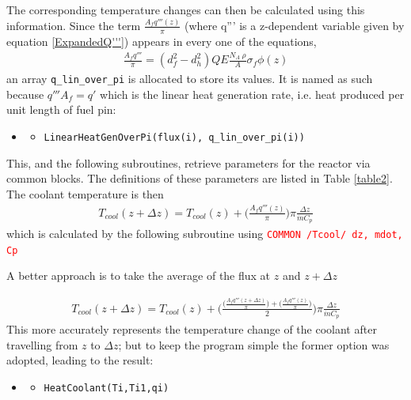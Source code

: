 \documentclass[a4paper, 12pt]{article}
\begin{document}
The corresponding temperature changes can then be calculated using this information.
Since the term $\frac{A_f q'''(z)}{\pi}$ (where q''' is a z-dependent variable given by equation \ref{ExpandedQ'''}) appears in every one of the equations,
\begin{align}
\frac{A_f q'''}{\pi} = (d_f^2-d_h^2) Q E \frac{N_A \:\rho}{A} \sigma_f \phi(z) \label{Afq'''pi}
\end{align}
an array \texttt{q\_lin\_over\_pi} is allocated to store its values. It is named as such because $q''' A_f = q'$ which is the linear heat generation rate, i.e. heat produced per unit length of fuel pin:
\begin{itemize}
	\item[]
	\begin{itemize}
	\item \texttt{\textcolor{subr}{LinearHeatGenOverPi}(flux(i), q\_lin\_over\_pi(i))}
	\end  {itemize}
\end  {itemize}
This, and the following subroutines, retrieve parameters for the reactor via common blocks. The definitions of these parameters are listed in Table \ref{table2}.\\

The coolant temperature is then 
\begin{align}\label{Tcool}
T_{cool}(z+\Delta z)= T_{cool}(z)+ \bigg(\frac{A_f q'''(z)}{\pi}\bigg) \pi \frac{\Delta z}{\dot{m}C_p}
\end{align}
which is calculated by the following subroutine using \texttt{\textcolor{red}{COMMON /Tcool/ dz, mdot, Cp}}

A better approach is to take the average of the flux at $z$ and $z+\Delta z$
	
\begin{align}
T_{cool}(z+\Delta z)= T_{cool}(z)+ \bigg(\frac{\big(\frac{A_f q'''(z+\Delta z)}{\pi}\big)+\big(\frac{A_f q'''(z)}{\pi}\big)}{2}\bigg) \pi \frac{\Delta z}{\dot{m}C_p}
\label{LinearInterp}
\end{align}
This more accurately represents the temperature change of the coolant after travelling from $z$ to $\Delta z$; but to keep the program simple the former option was adopted, leading to the result:

\begin{itemize}
	\item[]
	\begin{itemize}
	\item \texttt{\textcolor{subr}{HeatCoolant}(Ti,Ti1,qi)}
	\end{itemize}
\end{itemize}
\end{document}
